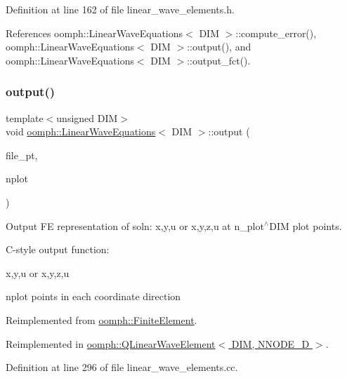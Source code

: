 Definition at line 162 of file linear\+\_\+wave\+\_\+elements.\+h.



References oomph\+::\+Linear\+Wave\+Equations$<$ D\+I\+M $>$\+::compute\+\_\+error(), oomph\+::\+Linear\+Wave\+Equations$<$ D\+I\+M $>$\+::output(), and oomph\+::\+Linear\+Wave\+Equations$<$ D\+I\+M $>$\+::output\+\_\+fct().

\mbox{\label{classoomph_1_1LinearWaveEquations_a2e3dd0d7c46d095fea74969c3648f0ca}} 
\subsubsection{\texorpdfstring{output()}{output()}\hspace{0.1cm}{\footnotesize\ttfamily [4/4]}}
{\footnotesize\ttfamily template$<$unsigned D\+IM$>$ \\
void \hyperlink{classoomph_1_1LinearWaveEquations}{oomph\+::\+Linear\+Wave\+Equations}$<$ D\+IM $>$\+::output (\begin{DoxyParamCaption}\item[{F\+I\+LE $\ast$}]{file\+\_\+pt,  }\item[{const unsigned \&}]{nplot }\end{DoxyParamCaption})\hspace{0.3cm}{\ttfamily [virtual]}}



Output FE representation of soln\+: x,y,u or x,y,z,u at n\+\_\+plot$^\wedge$\+D\+IM plot points. 

C-\/style output function\+:

x,y,u or x,y,z,u

nplot points in each coordinate direction 

Reimplemented from \hyperlink{classoomph_1_1FiniteElement_adfaee690bb0608f03320eeb9d110d48c}{oomph\+::\+Finite\+Element}.



Reimplemented in \hyperlink{classoomph_1_1QLinearWaveElement_a4fe8053385a090049e459faa0e0cc3be}{oomph\+::\+Q\+Linear\+Wave\+Element$<$ D\+I\+M, N\+N\+O\+D\+E\+\_\+D $>$}.



Definition at line 296 of file linear\+\_\+wave\+\_\+elements.\+cc.




